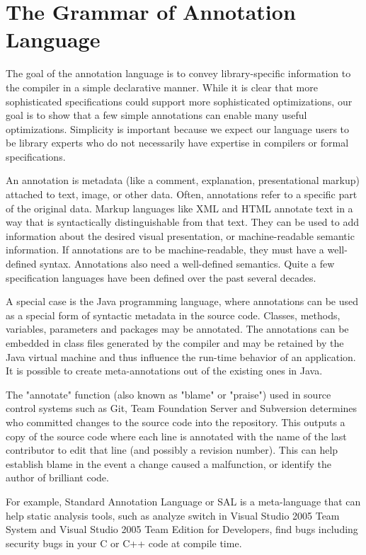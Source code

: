 \section{The Grammar of Annotation Language}

The goal of the annotation language is to convey library-specific information to the compiler in a simple declarative manner. While it is clear that more sophisticated specifications could support more sophisticated optimizations, our goal is to show that a few simple annotations can enable many useful optimizations. Simplicity is important because we expect our language users to be library experts who do not necessarily have expertise in compilers or formal specifications.

An annotation is metadata (like a comment, explanation, presentational markup) attached to text, image, or other data. Often, annotations refer to a specific part of the original data. Markup languages like XML and HTML annotate text in a way that is syntactically distinguishable from that text. They can be used to add information about the desired visual presentation, or machine-readable semantic information. If annotations are to be machine-readable, they must have a well-defined syntax. Annotations also need a well-defined semantics. Quite a few specification languages have been defined over the past several decades. 

A special case is the Java programming language, where annotations can be used as a special form of syntactic metadata in the source code. Classes, methods, variables, parameters and packages may be annotated. The annotations can be embedded in class files generated by the compiler and may be retained by the Java virtual machine and thus influence the run-time behavior of an application. It is possible to create meta-annotations out of the existing ones in Java.

The "annotate" function (also known as "blame" or "praise") used in source control systems such as Git, Team Foundation Server and Subversion determines who committed changes to the source code into the repository. This outputs a copy of the source code where each line is annotated with the name of the last contributor to edit that line (and possibly a revision number). This can help establish blame in the event a change caused a malfunction, or identify the author of brilliant code.

For example, Standard Annotation Language or SAL \cite{ref_51_microsoft:sal} is a meta-language that can help static analysis tools, such as analyze switch in Visual Studio 2005 Team System and Visual Studio 2005 Team Edition for Developers, find bugs including security bugs in your C or C++ code at compile time.

